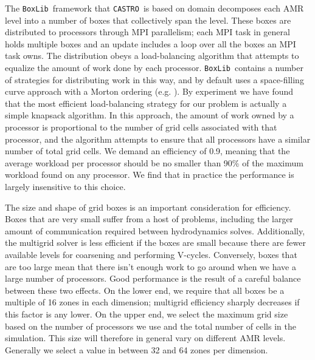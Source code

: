 \documentclass[iop,numberedappendix]{../emulateapj}
\newcommand{\boxlib}{\texttt{BoxLib}}
\newcommand{\castro}{\texttt{CASTRO}}
\begin{document}
The \boxlib\ framework that \castro\ is based on domain decomposes each AMR level into a number 
of boxes that collectively span the level. These boxes are distributed to processors 
through MPI parallelism; each MPI task in general holds multiple boxes and 
an update includes a loop over all the boxes an MPI task owns. The distribution 
obeys a load-balancing algorithm that attempts to equalize the amount of work 
done by each processor. \boxlib\ contains a number of strategies for distributing 
work in this way, and by default uses a space-filling curve approach with a 
Morton ordering (e.g. \cite{sasidharan:2015,beichl:1998}). By experiment we have found that the most efficient load-balancing 
strategy for our problem is actually a simple knapsack algorithm. In this approach, 
the amount of work owned by a processor is proportional to the number of grid cells 
associated with that processor, and the algorithm attempts to ensure that all 
processors have a similar number of total grid cells. We demand an efficiency of 0.9,
meaning that the average workload per processor should be no smaller than 90\% of the 
maximum workload found on any processor. We find that in practice the 
performance is largely insensitive to this choice.

The size and shape of grid boxes is an important consideration for efficiency. 
Boxes that are very small suffer from a host of problems, including the larger 
amount of communication required between hydrodynamics solves. Additionally, 
the multigrid solver is less efficient if the boxes are small because there 
are fewer available levels for coarsening and performing V-cycles. Conversely, 
boxes that are too large mean that there isn't enough work to go around when we 
have a large number of processors. Good performance is the result of a careful 
balance between these two effects. On the lower end, we require that all boxes 
be a multiple of 16 zones in each dimension; multigrid efficiency sharply decreases 
if this factor is any lower. On the upper end, we select the maximum grid size 
based on the number of processors we use and the total number of cells in the 
simulation. This size will therefore in general vary on different AMR levels. 
Generally we select a value in between 32 and 64 zones per dimension.
\end{document}
